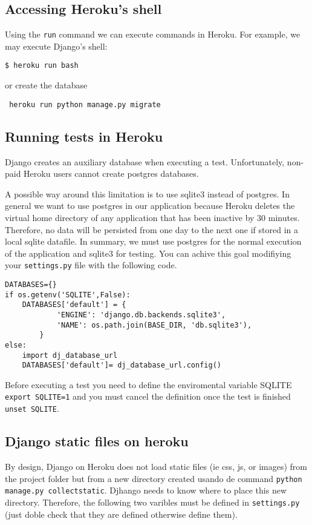 \documentclass[12pt]{article} %
\begin{document}
\subsection{Accessing Heroku's shell}

Using the \texttt{run} command we can execute commands in Heroku. For example,  we may execute Django's shell:

\begin{verbatim}
$ heroku run bash
\end{verbatim}
or create the database

\begin{verbatim}
 heroku run python manage.py migrate
\end{verbatim}

\subsection{Running tests in Heroku}
Django creates an auxiliary database when executing a test. Unfortunately, non-paid Heroku users 
cannot create postgres databases.

A possible way around this limitation is to use sqlite3 instead of postgres. In general we want to use postgres in our application because Heroku deletes the virtual home directory of any application that has been inactive by 30 minutes. Therefore, no data will be persisted from one day to the next one if stored in a local sqlite datafile. In summary, we must use postgres for the normal execution of the application and sqlite3 for testing. You can achive this goal modifiying your \texttt{settings.py} file with the following code. 


\begin{verbatim}
DATABASES={}
if os.getenv('SQLITE',False):
    DATABASES['default'] = {
            'ENGINE': 'django.db.backends.sqlite3',
            'NAME': os.path.join(BASE_DIR, 'db.sqlite3'),
        }
else:
    import dj_database_url
    DATABASES['default']= dj_database_url.config()
\end{verbatim}



Before executing a test you need to define the enviromental variable SQLITE \texttt{export SQLITE=1} and you must cancel the definition once the test is finished \texttt{unset SQLITE}. 

\subsection{Django static files on heroku}
By design, Django on Heroku does not load static files  (ie css, js, or images) from the project folder but from a new directory created usando de command \texttt{python manage.py collectstatic}. Djhango needs to know where to place this new directory. Therefore, the following two varibles must be defined in \texttt{settings.py}  (just doble check that they are defined otherwise define them).
\end{document}
